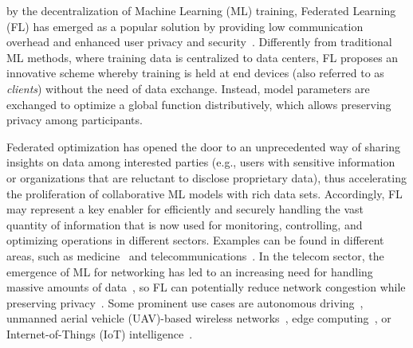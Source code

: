 \documentclass[10pt,journal,compsoc]{IEEEtran}
\begin{document}
\IEEEdisplaynontitleabstractindextext

%
\IEEEpeerreviewmaketitle



 by the decentralization of Machine Learning (ML) training, Federated Learning (FL) has emerged as a popular solution by providing low communication overhead and enhanced user privacy and security~\cite{konevcny2016federated}. Differently from traditional ML methods, where training data is centralized to data centers, FL proposes an innovative scheme whereby training is held at end devices (also referred to as \emph{clients}) without the need of data exchange. Instead, model parameters are exchanged to optimize a global function distributively, which allows preserving privacy among participants.

Federated optimization has opened the door to an unprecedented way of sharing insights on data among interested parties (e.g., users with sensitive information or organizations that are reluctant to disclose proprietary data), thus accelerating the proliferation of collaborative ML models with rich data sets. Accordingly, FL may represent a key enabler for efficiently and securely handling the vast quantity of information that is now used for monitoring, controlling, and optimizing operations in different sectors. Examples can be found in different areas, such as medicine~\cite{chen2020fedhealth, nguyen2021federated2} and telecommunications~\cite{lim2020federated}. In the telecom sector, the emergence of ML for networking has led to an increasing need for handling massive amounts of data~\cite{wilhelmi2020flexible}, so FL can potentially reduce network congestion while preserving privacy~\cite{niknam2020federated}. Some prominent use cases are autonomous driving~\cite{du2020federated}, unmanned aerial vehicle (UAV)-based wireless networks~\cite{brik2020federated}, edge computing~\cite{wang2019adaptive}, or Internet-of-Things (IoT) intelligence~\cite{mills2019communication}. 
\end{document}
